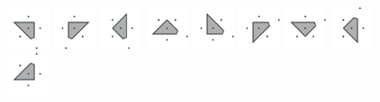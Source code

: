 \documentclass[text.tex]{subfiles}
\begin{document}
\begin{figure}[h!]
\centering
\includegraphics[width=0.11\textwidth]{img/results/tiles/octagon_100000_(1_0alpha_1)_017.pdf}
\includegraphics[width=0.11\textwidth]{img/results/tiles/octagon_100000_(1_0alpha_1)_018.pdf}
\includegraphics[width=0.11\textwidth]{img/results/tiles/octagon_100000_(1_0alpha_1)_019.pdf}
\includegraphics[width=0.11\textwidth]{img/results/tiles/octagon_100000_(1_0alpha_1)_020.pdf}
\includegraphics[width=0.11\textwidth]{img/results/tiles/octagon_100000_(1_0alpha_1)_021.pdf}
\includegraphics[width=0.11\textwidth]{img/results/tiles/octagon_100000_(1_0alpha_1)_022.pdf}
\includegraphics[width=0.11\textwidth]{img/results/tiles/octagon_100000_(1_0alpha_1)_023.pdf}
\includegraphics[width=0.11\textwidth]{img/results/tiles/octagon_100000_(1_0alpha_1)_024.pdf}
\includegraphics[width=0.11\textwidth]{img/results/tiles/octagon_100000_(1_0alpha_1)_025.pdf}

\end{figure}
\end{document}
